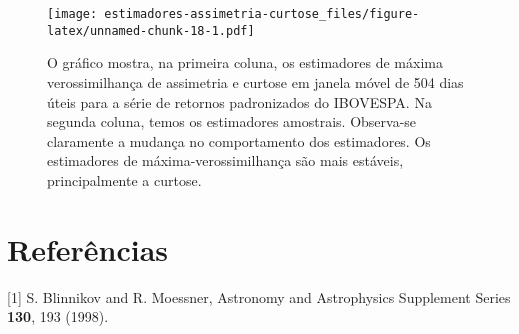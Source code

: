 \documentclass[]{article}
\newenvironment{Shaded}{\begin{snugshade}}{\end{snugshade}}
\newcommand{\KeywordTok}[1]{\textcolor[rgb]{0.13,0.29,0.53}{\textbf{#1}}}
\newcommand{\DataTypeTok}[1]{\textcolor[rgb]{0.13,0.29,0.53}{#1}}
\newcommand{\DecValTok}[1]{\textcolor[rgb]{0.00,0.00,0.81}{#1}}
\newcommand{\FloatTok}[1]{\textcolor[rgb]{0.00,0.00,0.81}{#1}}
\newcommand{\StringTok}[1]{\textcolor[rgb]{0.31,0.60,0.02}{#1}}
\newcommand{\OperatorTok}[1]{\textcolor[rgb]{0.81,0.36,0.00}{\textbf{#1}}}
\newcommand{\NormalTok}[1]{#1}
\begin{document}
\begin{Shaded}
\end{Shaded}

\begin{figure}
\centering
\texttt{[image: estimadores-assimetria-curtose\_files/figure-latex/unnamed-chunk-18-1.pdf]}
\caption{\label{fig:mle-skewness-kurtosis-ma} O gráfico mostra, na
primeira coluna, os estimadores de máxima verossimilhança de assimetria
e curtose em janela móvel de 504 dias úteis para a série de retornos
padronizados do IBOVESPA. Na segunda coluna, temos os estimadores
amostrais. Observa-se claramente a mudança no comportamento dos
estimadores. Os estimadores de máxima-verossimilhança são mais estáveis,
principalmente a curtose.}
\end{figure}

\section*{Referências}\label{referencias}

\hypertarget{refs}{}
\hypertarget{ref-blinnikov1998}{}
{[}1{]} S. Blinnikov and R. Moessner, Astronomy and Astrophysics
Supplement Series \textbf{130}, 193 (1998).
\end{document}
